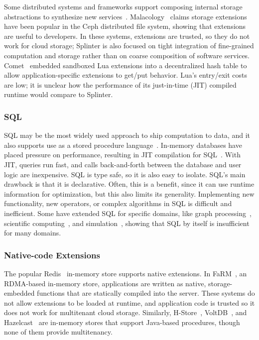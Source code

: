 Some distributed systems and frameworks support composing internal storage
abstractions to synthesize new
services~\cite{corfu,tango,istore,sdds,boxwood,malacology}.
Malacology~\cite{malacology} claims storage extensions have been popular
in the Ceph distributed file system, showing that extensions are useful to
developers. In these systems, extensions are trusted, so they do not work for
cloud storage; Splinter is also focused on tight integration of fine-grained
computation and storage rather than on coarse composition of software services.
Comet~\cite{comet} embedded sandboxed Lua extensions into a decentralized hash
table to allow application-specific extensions to get/put behavior.
Lua's entry/exit costs are low; it is unclear how the performance of its
just-in-time (JIT) compiled runtime would compare to Splinter.

\subsubsection{SQL}
%
SQL may be the most widely used approach to ship computation to data,
and it also supports use as a stored procedure language~\cite{tsql,plsql}.
In-memory databases
have placed pressure on performance, resulting
in JIT compilation for SQL~\cite{hekaton-compile,hyper-llvm}. With JIT,
queries run fast, and calls
back-and-forth between the database and user logic are inexpensive. SQL is type
safe, so it is also easy to isolate. SQL's main
drawback is that it is declarative. Often, this is a benefit,
since it can use runtime information for optimization, but this also
limits its generality. Implementing new
functionality, new operators, or complex algorithms in SQL is difficult and
inefficient.
%
Some have extended SQL for specific domains, like graph
processing~\cite{neo4j}, scientific computing~\cite{gmm,scidb}, and
simulation~\cite{simsql}, showing that SQL by itself is insufficient for many domains.

\subsubsection{Native-code Extensions}
%
The popular
Redis~\cite{redis} in-memory store supports native extensions. In
FaRM~\cite{farm-2014,farm-txns}, an RDMA-based in-memory store, applications are written as
native, storage-embedded functions that are statically compiled into the
server.  These systems do not allow extensions to be loaded at runtime, and
application code is trusted so it does not work for multitenant cloud storage.
Similarly, H-Store~\cite{hstore}, VoltDB~\cite{voltdb}, and
Hazelcast~\cite{hazelcast} are in-memory stores that support Java-based
procedures, though none of them provide multitenancy.

